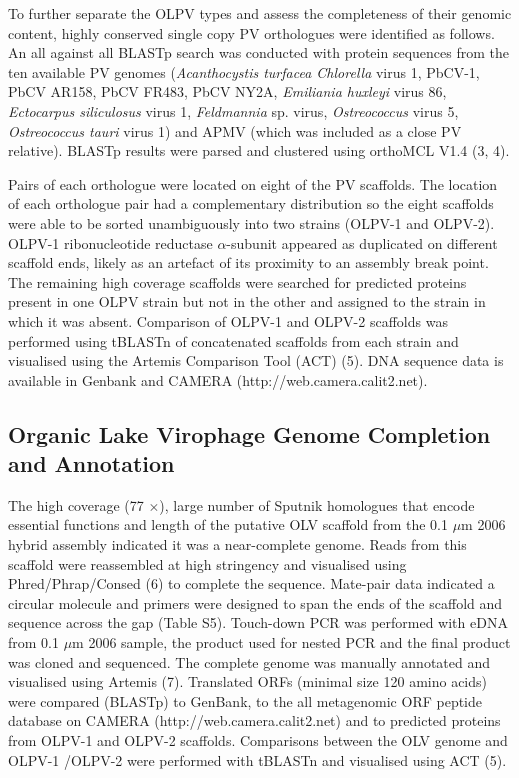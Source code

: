 To further separate the OLPV types and assess the completeness of their genomic content, highly conserved single copy PV orthologues were identified as follows. 
An all against all BLASTp search was conducted with protein sequences from the ten available PV genomes 
(\textit{Acanthocystis turfacea Chlorella} virus 1, PbCV-1, PbCV AR158, PbCV FR483, PbCV NY2A, \textit{Emiliania huxleyi} virus 86, \textit{Ectocarpus siliculosus} virus 1, \textit{Feldmannia} sp. virus, \textit{Ostreococcus} virus 5, \textit{Ostreococcus tauri} virus 1) and APMV (which was included as a close PV relative). 
BLASTp results were parsed and clustered using orthoMCL V1.4 (3, 4). 

Pairs of each orthologue were located on eight of the PV scaffolds. 
The location of each orthologue pair had a complementary distribution so the eight scaffolds were able to be sorted unambiguously into two strains (OLPV-1 and OLPV-2). 
OLPV-1 ribonucleotide reductase $\alpha$-subunit appeared as duplicated on different scaffold ends, likely as an artefact of its proximity to an assembly break point. 
The remaining high coverage scaffolds were searched for predicted proteins present in one OLPV strain but not in the other and assigned to the strain in which it was absent. 
Comparison of OLPV-1 and OLPV-2 scaffolds was performed using tBLASTn of concatenated scaffolds from each strain and visualised using the Artemis Comparison Tool (ACT) (5). 
DNA sequence data is available in Genbank and CAMERA (http://web.camera.calit2.net).

\subsection[Genome Completion and Annotation]{Organic Lake Virophage Genome Completion and Annotation}
The high coverage (77 $\times$), large number of Sputnik homologues that encode essential functions and length of the putative OLV scaffold from the 0.1 $\mu$m 2006 hybrid assembly indicated it was a near-complete genome. 
Reads from this scaffold were reassembled at high stringency and visualised using Phred/Phrap/Consed (6) to complete the sequence. 
Mate-pair data indicated a circular molecule and primers were designed to span the ends of the scaffold and sequence across the gap (Table S5). 
Touch-down PCR was performed with eDNA from 0.1 $\mu$m 2006 sample, the product used for nested PCR and the final product was cloned and sequenced. 
The complete genome was manually annotated and visualised using Artemis (7). 
Translated ORFs (minimal size 120 amino acids) were compared (BLASTp) to GenBank, to the all metagenomic ORF peptide database on CAMERA (http://web.camera.calit2.net) and to predicted proteins from OLPV-1 and OLPV-2 scaffolds. 
Comparisons between the OLV genome and OLPV-1 /OLPV-2 were performed with tBLASTn and visualised using ACT (5). 

